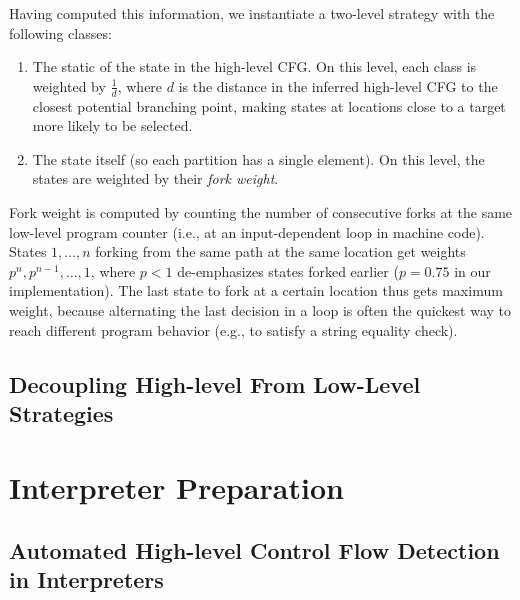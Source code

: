 Having computed this information, we instantiate a two-level \cupa strategy with the following classes:
\begin{enumerate}
\item The static \hlpc of the state in the high-level CFG.  On this level, each class is weighted by $\frac{1}{d}$, where $d$ is the distance in the inferred high-level CFG to the closest potential branching point, making states at locations close to a target more likely to be selected.
\item The state itself (so each partition has a single element).  On this level, the states are weighted by their \textit{fork weight}.
\end{enumerate}

Fork weight is computed by counting the number of consecutive forks at the same low-level program counter (i.e., at an input-dependent loop in machine code).  States $1, \ldots, n$ forking from the same path at the same location get weights $p^n, p^{n-1}, \ldots, 1$, where $p < 1$ de-emphasizes states forked earlier ($p = 0.75$ in our implementation).  The last state to fork at a certain location thus gets maximum weight, because alternating the last decision in a loop is often the quickest way to reach different program behavior (e.g., to satisfy a string equality check).


\subsection{Decoupling High-level From Low-Level Strategies}

% 



\section{Interpreter Preparation}


\subsection{Automated High-level Control Flow Detection in Interpreters}


